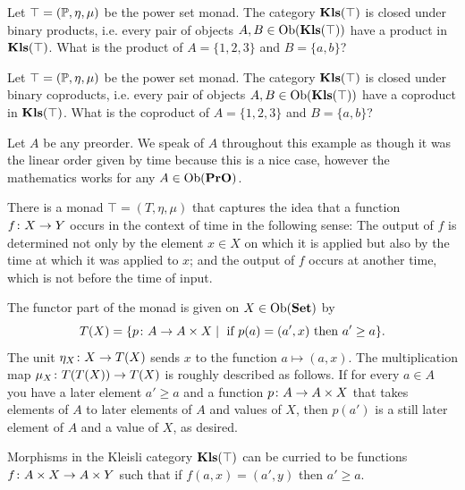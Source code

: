 \documentclass[CT4S-EN-RU]{subfiles}
\begin{document}
\begin{exercise}
Let $\top=({\mathbb P},\eta,\mu)$ be the power set monad. The category ${\bf Kls}(\top)$ is closed under binary products, i.e. every pair of objects $A,B\in\textnormal{Ob}({\bf Kls}(\top))$ have a product in ${\bf Kls}(\top)$. What is the product of $A=\{1,2,3\}$ and $B=\{a,b\}$?
\end{exercise}

\begin{exercise}
Let $\top=({\mathbb P},\eta,\mu)$ be the power set monad. The category ${\bf Kls}(\top)$ is closed under binary coproducts, i.e. every pair of objects $A,B\in\textnormal{Ob}({\bf Kls}(\top))$ have a coproduct in ${\bf Kls}(\top)$. What is the coproduct of $A=\{1,2,3\}$ and $B=\{a,b\}$?
\end{exercise}

\begin{example}\label{ex:preorder monad}

Let $A$ be any preorder. We speak of $A$ throughout this example as though it was the linear order given by time because this is a nice case, however the mathematics works for any $A\in\textnormal{Ob}({\bf PrO})$. 

There is a monad $\top=(T,\eta,\mu)$ that captures the idea that a function $f\colon X\rightarrow Y$ occurs in the context of time in the following sense: The output of $f$ is determined not only by the element $x\in X$ on which it is applied but also by the time at which it was applied to $x$; and the output of $f$ occurs at another time, which is not before the time of input.

The functor part of the monad is given on $X\in\textnormal{Ob}({\bf Set})$ by
$$T(X)=\{p\colon A\rightarrow A\times X{\;|\;}\textnormal{ if } p(a)=(a',x)\textnormal{ then } a'\geq a\}.$$
The unit $\eta_X\colon X\rightarrow T(X)$ sends $x$ to the function $a\mapsto (a,x)$. The multiplication map $\mu_X\colon T(T(X))\rightarrow T(X)$ is roughly described as follows. If for every $a\in A$ you have a later element $a'\geq a$ and a function $p\colon A\rightarrow A\times X$ that takes elements of $A$ to later elements of $A$ and values of $X$, then $p(a')$ is a still later element of $A$ and a value of $X$, as desired.

Morphisms in the Kleisli category ${\bf Kls}(\top)$ can be curried to be functions $f\colon A\times X\rightarrow A\times Y$ such that if $f(a,x)=(a',y)$ then $a'\geq a$. 

\end{example}
\end{document}
